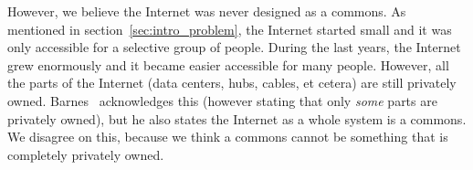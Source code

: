 However, we believe the Internet was never designed as a commons.
As mentioned in section~\ref{sec:intro_problem}, the Internet started small and it was only accessible for a selective group of people.
During the last years, the Internet grew enormously and it became easier accessible for many people.
However, all the parts of the Internet (data centers, hubs, cables, et cetera) are still privately owned.
Barnes~\cite{barnes2003capitalism} acknowledges this (however stating that only \emph{some} parts are privately owned), but he also states the Internet as a whole system is a commons.
We disagree on this, because we think a commons cannot be something that is completely privately owned.